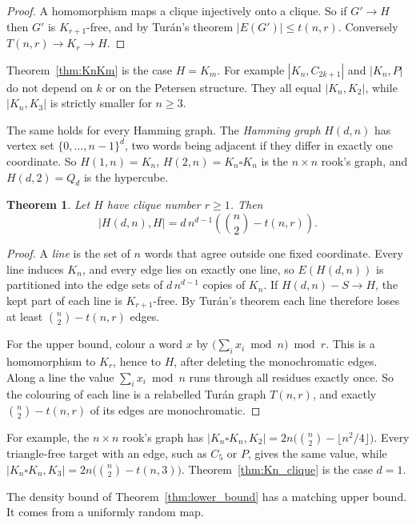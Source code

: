 \documentclass{article}
\newtheorem{theorem}{Theorem}[section]
\theoremstyle{definition}
\begin{document}
\begin{proof}
A homomorphism maps a clique injectively onto a clique.  So if $G'\to H$ then
$G'$ is $K_{r+1}$-free, and by Tur\'an's theorem $|E(G')|\le t(n,r)$.
Conversely $T(n,r)\to K_r\to H$.
\end{proof}

Theorem~\ref{thm:KnKm} is the case $H=K_m$.  For example $|K_n,C_{2k+1}|$ and
$|K_n,P|$ do not depend on $k$ or on the Petersen structure.  They all equal
$|K_n,K_2|$, while $|K_n,K_3|$ is strictly smaller for $n\ge3$.

The same holds for every Hamming graph.  The \emph{Hamming graph} $H(d,n)$ has
vertex set $\{0,\dots,n-1\}^d$, two words being adjacent if they differ in exactly
one coordinate.  So $H(1,n)=K_n$, $H(2,n)=K_n\square K_n$ is the $n\times n$
rook's graph, and $H(d,2)=Q_d$ is the hypercube.

\begin{theorem}
\label{thm:hamming}
Let $H$ have clique number $r\ge1$.  Then
\[
  |H(d,n),H| = d\,n^{d-1}\left(\binom n2-t(n,r)\right).
\]
\end{theorem}

\begin{proof}
A \emph{line} is the set of $n$ words that agree outside one fixed coordinate.
Every line induces $K_n$, and every edge lies on exactly one line, so $E(H(d,n))$
is partitioned into the edge sets of $d\,n^{d-1}$ copies of $K_n$.  If
$H(d,n)-S\to H$, the kept part of each line is $K_{r+1}$-free.  By Tur\'an's
theorem each line therefore loses at least $\binom n2-t(n,r)$ edges.

For the upper bound, colour a word $x$ by $\bigl(\sum_i x_i\bmod n\bigr)\bmod r$.
This is a homomorphism to $K_r$, hence to $H$, after deleting the monochromatic
edges.  Along a line the value $\sum_i x_i\bmod n$ runs through all residues
exactly once.  So the colouring of each line is a relabelled Tur\'an graph
$T(n,r)$, and exactly $\binom n2-t(n,r)$ of its edges are monochromatic.
\end{proof}

For example, the $n\times n$ rook's graph has $|K_n\square K_n,K_2|=2n\bigl(\binom
n2-\lfloor n^2/4\rfloor\bigr)$.  Every triangle-free target with an edge, such as
$C_5$ or $P$, gives the same value, while $|K_n\square K_n,K_3|=2n\bigl(\binom n2-t(n,3)\bigr)$.
Theorem~\ref{thm:Kn_clique} is the case $d=1$.

The density bound of Theorem~\ref{thm:lower_bound} has a matching upper bound.
It comes from a uniformly random map.
\end{document}
